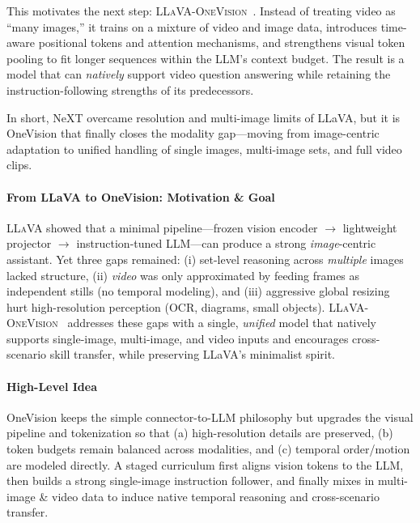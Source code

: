 \begin{enrichment}
\begin{enrichment}
        This motivates the next step: \textsc{LLaVA-OneVision}~\cite{li2024_llavaonevision}. Instead of treating video as “many images,” it trains on a mixture of video and image data, introduces time-aware positional tokens and attention mechanisms, and strengthens visual token pooling to fit longer sequences within the LLM’s context budget. The result is a model that can \emph{natively} support video question answering while retaining the instruction-following strengths of its predecessors.  
        
        In short, NeXT overcame resolution and multi-image limits of LLaVA, but it is OneVision that finally closes the modality gap—moving from image-centric adaptation to unified handling of single images, multi-image sets, and full video clips.  
        
    \end{enrichment}
    
    \newpage
    
    \begin{enrichment}
        \label{enr:subsec_chapter24_llava_onevision}
        
        \paragraph{From LLaVA to OneVision: Motivation \& Goal}
        \textsc{LLaVA} showed that a minimal pipeline---frozen vision encoder $\rightarrow$ lightweight projector $\rightarrow$ instruction-tuned LLM---can produce a strong \emph{image}-centric assistant. Yet three gaps remained: (i) set-level reasoning across \emph{multiple} images lacked structure, (ii) \emph{video} was only approximated by feeding frames as independent stills (no temporal modeling), and (iii) aggressive global resizing hurt high-resolution perception (OCR, diagrams, small objects). \textsc{LLaVA-OneVision}~\cite{li2024_llavaonevision} addresses these gaps with a single, \emph{unified} model that natively supports single-image, multi-image, and video inputs and encourages cross-scenario skill transfer, while preserving LLaVA’s minimalist spirit.
        
        \paragraph{High-Level Idea}
        OneVision keeps the simple connector-to-LLM philosophy but upgrades the visual pipeline and tokenization so that (a) high-resolution details are preserved, (b) token budgets remain balanced across modalities, and (c) temporal order/motion are modeled directly. A staged curriculum first aligns vision tokens to the LLM, then builds a strong single-image instruction follower, and finally mixes in multi-image \& video data to induce native temporal reasoning and cross-scenario transfer.
        

\end{enrichment}
\end{enrichment}
